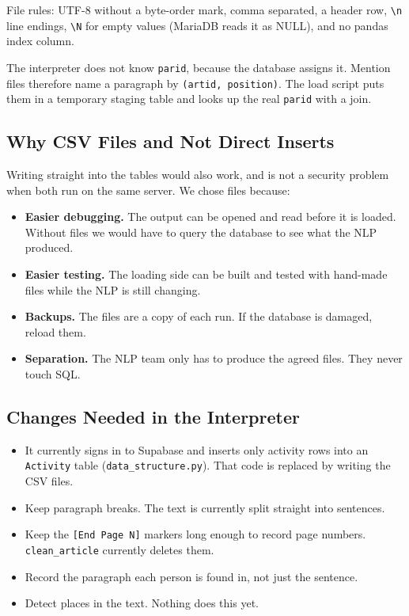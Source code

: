 \documentclass[11pt]{article}
\newcommand{\code}[1]{\texttt{#1}}
\begin{document}
File rules: UTF-8 without a byte-order mark, comma separated, a header
row, \code{\textbackslash n} line endings, \code{\textbackslash N} for
empty values (MariaDB reads it as NULL), and no pandas index column.

The interpreter does not know \code{parid}, because the database assigns
it. Mention files therefore name a paragraph by \code{(artid, position)}.
The load script puts them in a temporary staging table and looks up the
real \code{parid} with a join.

\subsection{Why CSV Files and Not Direct Inserts}

Writing straight into the tables would also work, and is not a security
problem when both run on the same server. We chose files because:

\begin{itemize}
  \item \textbf{Easier debugging.} The output can be opened and read before
  it is loaded. Without files we would have to query the database to see
  what the NLP produced.
  \item \textbf{Easier testing.} The loading side can be built and tested
  with hand-made files while the NLP is still changing.
  \item \textbf{Backups.} The files are a copy of each run. If the
  database is damaged, reload them.
  \item \textbf{Separation.} The NLP team only has to produce the agreed
  files. They never touch SQL.
\end{itemize}

\subsection{Changes Needed in the Interpreter}

\begin{itemize}
  \item It currently signs in to Supabase and inserts only activity rows
  into an \code{Activity} table (\code{data\_structure.py}). That code is
  replaced by writing the CSV files.
  \item Keep paragraph breaks. The text is currently split straight into
  sentences.
  \item Keep the \code{[End Page N]} markers long enough to record page
  numbers. \code{clean\_article} currently deletes them.
  \item Record the paragraph each person is found in, not just the
  sentence.
  \item Detect places in the text. Nothing does this yet.
\end{itemize}
\end{document}
